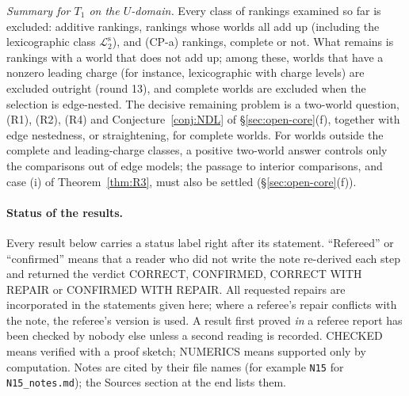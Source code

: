 \documentclass[11pt]{article}
\theoremstyle{definition}
\theoremstyle{remark}
\newcommand{\src}[1]{\texttt{#1}}
\newcommand{\Ltwo}{\mathcal L_2^{\mathrm s}}
\begin{document}
\emph{Summary for $T_1$ on the $U$-domain.} Every class of rankings examined so far is excluded: additive rankings, rankings whose worlds all add up (including the lexicographic class $\Ltwo$), and (CP-a) rankings, complete or not. What remains is rankings with a world that does not add up; among these, worlds that have a nonzero leading charge (for instance, lexicographic with charge levels) are excluded outright (round 13), and complete worlds are excluded when the selection is edge-nested. The decisive remaining problem is a two-world question, (R1), (R2), (R4) and Conjecture~\ref{conj:NDL} of \S\ref{sec:open-core}(f), together with edge nestedness, or straightening, for complete worlds. For worlds outside the complete and leading-charge classes, a positive two-world answer controls only the comparisons out of edge models; the passage to interior comparisons, and case (i) of Theorem~\ref{thm:R3}, must also be settled (\S\ref{sec:open-core}(f)).

\paragraph{Status of the results.}
Every result below carries a status label right after its statement. ``Refereed'' or ``confirmed'' means that a reader who did not write the note re-derived each step and returned the verdict CORRECT, CONFIRMED, CORRECT WITH REPAIR or CONFIRMED WITH REPAIR. All requested repairs are incorporated in the statements given here; where a referee's repair conflicts with the note, the referee's version is used. A result first proved \emph{in} a referee report has been checked by nobody else unless a second reading is recorded. CHECKED means verified with a proof sketch; NUMERICS means supported only by computation. Notes are cited by their file names (for example \src{N15} for \src{N15\_notes.md}); the Sources section at the end lists them.
\end{document}
